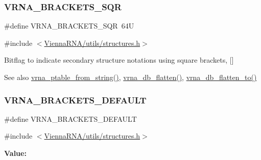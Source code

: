 \subsubsection{\texorpdfstring{VRNA\_BRACKETS\_SQR}{VRNA\_BRACKETS\_SQR}}
{\footnotesize\ttfamily \#define V\+R\+N\+A\+\_\+\+B\+R\+A\+C\+K\+E\+T\+S\+\_\+\+S\+QR~64U}



{\ttfamily \#include $<$\mbox{\hyperlink{utils_2structures_8h}{Vienna\+R\+N\+A/utils/structures.\+h}}$>$}



Bitflag to indicate secondary structure notations using square brackets, {\ttfamily \mbox{[}\mbox{]}} 

\begin{DoxySeeAlso}{See also}
\mbox{\hyperlink{group__struct__utils__pair__table_gac76c9ef3de507748fb0416a59323362b}{vrna\+\_\+ptable\+\_\+from\+\_\+string()}}, \mbox{\hyperlink{group__struct__utils__dot__bracket_gafd1304f5a86e2e3f1425e725cde44fa2}{vrna\+\_\+db\+\_\+flatten()}}, \mbox{\hyperlink{group__struct__utils__dot__bracket_ga690425199c8b71545e7196e3af1436f8}{vrna\+\_\+db\+\_\+flatten\+\_\+to()}} 
\end{DoxySeeAlso}
\mbox{\label{group__struct__utils__dot__bracket_ga559ebf76b1b289f85309f4206e99aa1a}} 
\subsubsection{\texorpdfstring{VRNA\_BRACKETS\_DEFAULT}{VRNA\_BRACKETS\_DEFAULT}}
{\footnotesize\ttfamily \#define V\+R\+N\+A\+\_\+\+B\+R\+A\+C\+K\+E\+T\+S\+\_\+\+D\+E\+F\+A\+U\+LT}



{\ttfamily \#include $<$\mbox{\hyperlink{utils_2structures_8h}{Vienna\+R\+N\+A/utils/structures.\+h}}$>$}

{\bfseries Value\+:}
\begin{DoxyCode}{0}

\end{DoxyCode}


